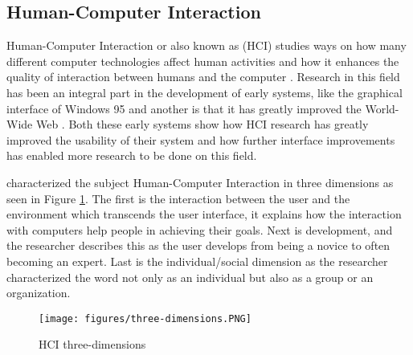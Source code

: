 
%

\subsection{Human-Computer Interaction}
Human-Computer Interaction or also known as (HCI) studies ways on how many different computer technologies affect human activities \cite{dix2009human} and how it enhances the quality of interaction between humans and the computer \cite{baecker2014readings}. Research in this field has been an integral part in the development of early systems, like the graphical interface of Windows 95 and another is that it has greatly improved the World-Wide Web \cite{myers1998brief}. Both these early systems show how HCI research has greatly improved the usability of their system and how further interface improvements has enabled more research to be done on this field. 

\citeauthor{kaptelinin1996activity} characterized the subject Human-Computer Interaction in three dimensions as seen in Figure \ref{fig:three_dimensions}. The first is the interaction between the user and the environment which transcends the user interface, it explains how the interaction with computers help people in achieving their goals. Next is development, and the researcher describes this as the user develops from being a novice to often becoming an expert. Last is the individual/social dimension as the researcher characterized the word  not only as an individual but also as a group or an organization.

\begin{figure}[H]
    \centering
    \texttt{[image: figures/three-dimensions.PNG]}
    \caption{HCI three-dimensions \protect\cite{kaptelinin1996activity}}
    \label{fig:three_dimensions}
\end{figure}


